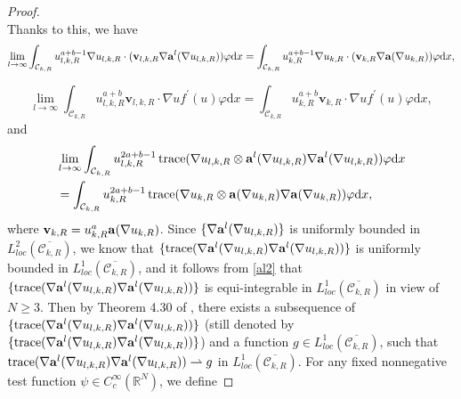 \documentclass[12pt]{amsart}
\theoremstyle{definition}
\theoremstyle{remark}
\theoremstyle{conclusion}
\theoremstyle{conjecture}
\numberwithin{equation}{section}
\begin{document}
\begin{proof}
\begin{equation*}
\end{equation*}
Thanks to this, we have
\begin{equation}\label{3.26}
\lim\limits_{l\rightarrow\infty}\int_{\mathcal{C}_{k,R}}u_{l,k,R}^{a+b-1}\nabla u_{l,k,R}\cdot (\mathbf{v}_{l,k,R}\nabla {\bf{a}}^l(\nabla u_{l,k,R}))\varphi\mathrm{d}x=\int_{\mathcal{C}_{k,R}}u_{k,R}^{a+b-1}\nabla u_{k,R}\cdot (\mathbf{v}_{k,R}\nabla {\bf{a}}(\nabla u_{k,R}))\varphi\mathrm{d}x,
\end{equation}

\begin{equation}\label{3.27}
\lim\limits_{l\rightarrow\infty}\int_{\mathcal{C}_{k,R}}u_{l,k,R}^{a+b}\mathbf{v}_{l,k,R}\cdot \nabla u f^{\prime}(u)\varphi\mathrm{d}x=\int_{\mathcal{C}_{k,R}}u_{k,R}^{a+b}\mathbf{v}_{k,R}\cdot \nabla u f^{\prime}(u)\varphi\mathrm{d}x,
\end{equation}
and
\begin{equation}\label{3.28}
\begin{aligned}
  &\lim\limits_{l\rightarrow\infty}\int_{\mathcal{C}_{k,R}} u_{l,k,R}^{2a+b-1}\operatorname{trace}(\nabla u_{l,k,R}\otimes {\bf{a}}^l(\nabla u_{l,k,R})\nabla {\bf{a}}^l(\nabla u_{l,k,R}))\varphi\mathrm{d}x\\
  &=\int_{\mathcal{C}_{k,R}} u_{k,R}^{2a+b-1}\operatorname{trace}(\nabla u_{k,R}\otimes {\bf{a}}(\nabla u_{k,R})\nabla {\bf{a}}(\nabla u_{k,R}))\varphi\mathrm{d}x,
\end{aligned}
\end{equation}
where $\mathbf{v}_{k,R}=u_{k,R}^a {\bf{a}}(\nabla u_{k,R})$. Since $\{\nabla {\bf{a}}^l(\nabla u_{l,k,R})\}$ is uniformly bounded in $L^2_{loc}(\overline{\mathcal{C}_{k,R}})$, we know that  $\{\operatorname{trace}(\nabla {\bf{a}}^l(\nabla u_{l,k,R})\nabla {\bf{a}}^l(\nabla u_{l,k,R}))\}$ is uniformly bounded in $L^1_{loc}(\overline{\mathcal{C}_{k,R}})$, and it follows from \eqref{al2} that $\{\operatorname{trace}(\nabla {\bf{a}}^l(\nabla u_{l,k,R})\nabla {\bf{a}}^l(\nabla u_{l,k,R}))\}$ is equi-integrable in $L^1_{loc}(\overline{\mathcal{C}_{k,R}})$ in view of $N\geq 3$. Then by Theorem 4.30 of \cite{Brezis}, there exists a subsequence of $\{\operatorname{trace}(\nabla {\bf{a}}^l(\nabla u_{l,k,R})\nabla {\bf{a}}^l(\nabla u_{l,k,R}))\}$ (still denoted by $\{\operatorname{trace}(\nabla {\bf{a}}^l(\nabla u_{l,k,R})\nabla {\bf{a}}^l(\nabla u_{l,k,R}))\}$) and a function $g\in L^1_{loc}(\overline{\mathcal{C}_{k,R}})$, such that $\operatorname{trace}(\nabla {\bf{a}}^l(\nabla u_{l,k,R})\nabla {\bf{a}}^l(\nabla u_{l,k,R}))\rightharpoonup g$ in $L^1_{loc}(\overline{\mathcal{C}_{k,R}})$. For any fixed nonnegative test function $\psi\in C^{\infty}_c(\mathbb{R}^N)$, we define

\end{proof}
\end{document}
